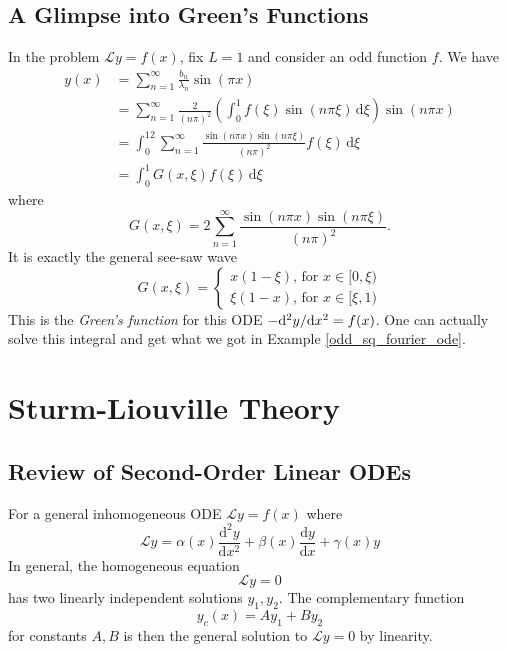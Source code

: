 \documentclass[a4paper]{article}
\begin{document}
\subsection{A Glimpse into Green's Functions}
In the problem $ \mathcal{L}y=f(x) $, fix $L=1$ and consider an odd function $f$.
We have
\begin{align}
    y(x)&=\sum_{n=1}^\infty\frac{b_n}{\lambda_n}\sin(\pi x)\nonumber\\
    &=\sum_{n=1}^\infty\frac{2}{(n\pi)^2}\left(\int_0^1f(\xi)\sin(n\pi\xi)\,\mathrm d\xi\right)\sin(n\pi x)\nonumber\\
    &=\int_0^12\sum_{n=1}^\infty\frac{\sin(n\pi x)\sin(n\pi\xi)}{(n\pi)^2}f(\xi)\,\mathrm d\xi\tag{Assume swapping limits}\\
    &=\int_0^1G(x,\xi)f(\xi)\,\mathrm d\xi
\end{align}
where
\begin{equation}
    G(x,\xi)=2\sum_{n=1}^\infty\frac{\sin(n\pi x)\sin(n\pi\xi)}{(n\pi)^2}.
\end{equation}
It is exactly the general see-saw wave
\begin{equation}
    G(x,\xi)=\begin{cases}
        x(1-\xi)\text{, for $x\in[0,\xi)$}\\
        \xi(1-x)\text{, for $x\in[\xi,1)$}
    \end{cases}
\end{equation}
This is the \textit{Green's function} for this ODE $-\mathrm{d}^2 y/\mathrm{d} x^2 =f(x)$.
One can actually solve this integral and get what we got in Example \ref{odd_sq_fourier_ode}.

\section{Sturm-Liouville Theory}
\subsection{Review of Second-Order Linear ODEs}
For a general inhomogeneous ODE $\mathcal Ly=f(x)$ where
\begin{equation}
    \mathcal Ly=\alpha(x)\frac{\mathrm d^2y}{\mathrm dx^2}+\beta(x)\frac{\mathrm dy}{\mathrm dx}+\gamma(x)y
\end{equation}
In general, the homogeneous equation
\begin{equation}
    \mathcal Ly=0
\end{equation}
has two linearly independent solutions $y_1,y_2$.
The complementary function
\begin{equation}
    y_c(x)=Ay_1+By_2
\end{equation}
for constants $A,B$ is then the general solution to $\mathcal Ly=0$ by linearity.
\end{document}
